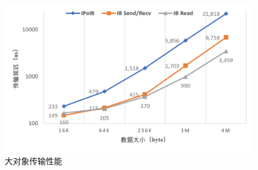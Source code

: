 \begin{frame}
\begin{columns}[t]
		\begin{figure}
			\centering
			\includegraphics[width=\textwidth]{image/chap04/big.png}
			\caption{大对象传输性能}
		\end{figure}
	\end{columns}
\end{frame}

